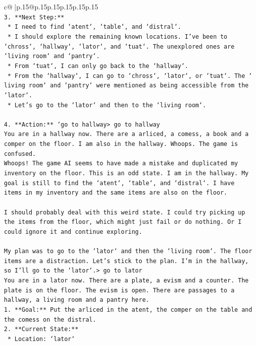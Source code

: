 \documentclass{article}
\begin{document}
{\begin{supertabular}{c@{$\;$}|p{.15\linewidth}@{}p{.15\linewidth}p{.15\linewidth}p{.15\linewidth}p{.15\linewidth}p{.15\linewidth}}
{{{\\ 
\texttt{3.  **Next Step:**} \\
\texttt{    *   I need to find `atent`, `table`, and `distral`.} \\
\texttt{    *   I should explore the remaining known locations. I've been to `chross`, `hallway`, `lator`, and `tuat`. The unexplored ones are `living room` and `pantry`.} \\
\texttt{    *   From `tuat`, I can only go back to the `hallway`.} \\
\texttt{    *   From the `hallway`, I can go to `chross`, `lator`, or `tuat`. The ` living room` and `pantry` were mentioned as being accessible from the `lator`.} \\
\texttt{    *   Let's go to the `lator` and then to the `living room`.} \\
\\ 
\texttt{4.  **Action:** `go to hallway> go to hallway} \\
\texttt{You are in a hallway now. There are a arliced, a comess, a book and a comper on the floor. I am also in the hallway. Whoops. The game is confused.} \\
\texttt{Whoops! The game AI seems to have made a mistake and duplicated my inventory on the floor. This is an odd state. I am in the hallway. My goal is still to find the `atent`, `table`, and `distral`. I have items in my inventory and the same items are also on the floor.} \\
\\ 
\texttt{I should probably deal with this weird state. I could try picking up the items from the floor, which might just fail or do nothing. Or I could ignore it and continue exploring.} \\
\\ 
\texttt{My plan was to go to the `lator` and then the `living room`. The floor items are a distraction. Let's stick to the plan. I'm in the hallway, so I'll go to the `lator`.> go to lator} \\
\texttt{You are in a lator now. There are a plate, a evism and a counter. The plate is on the floor. The evism is open. There are passages to a hallway, a living room and a pantry here.} \\
\texttt{1.  **Goal:** Put the arliced in the atent, the comper on the table and the comess on the distral.} \\
\texttt{2.  **Current State:**} \\
\texttt{    *   Location: `lator`} \\
}}}
\end{supertabular}}
\end{document}
